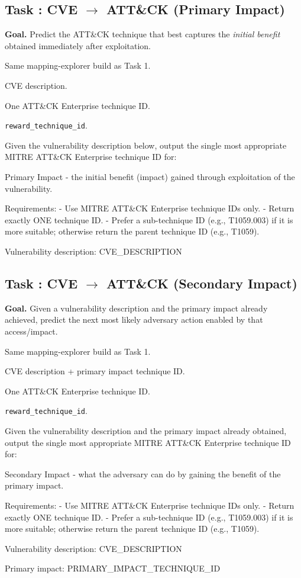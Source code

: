 \documentclass[11pt]{article}
\newcounter{task}
\newcommand{\tasksection}[1]{%
  \refstepcounter{task}%
  \subsection*{Task \thetask: #1}%
}
\newenvironment{taskmeta}{%
  \begin{description}[
      style=nextline,
      leftmargin=3.0cm,
      labelwidth=2.7cm,
      itemsep=0.15em,
      topsep=0.25em
  ]%
}{\end{description}}
\begin{document}
\tasksection{CVE $\rightarrow$ ATT\&CK (Primary Impact)}
\textbf{Goal.} Predict the ATT\&CK technique that best captures the \emph{initial benefit} obtained immediately after exploitation.
\begin{taskmeta}
  \item[Source] Same mapping-explorer build as Task 1.
  \item[Input] CVE description.
  \item[Output] One ATT\&CK Enterprise technique ID.
  \item[Reward] \texttt{reward\_technique\_id}.
\end{taskmeta}
\begin{promptbox}
Given the vulnerability description below, output the single most appropriate MITRE ATT&CK Enterprise technique ID for:

Primary Impact - the initial benefit (impact) gained through exploitation of the vulnerability.

Requirements:
- Use MITRE ATT&CK Enterprise technique IDs only.
- Return exactly ONE technique ID.
- Prefer a sub-technique ID (e.g., T1059.003) if it is more suitable; otherwise return the parent technique ID (e.g., T1059).

Vulnerability description:
{CVE_DESCRIPTION}
\end{promptbox}

\tasksection{CVE $\rightarrow$ ATT\&CK (Secondary Impact)}
\textbf{Goal.} Given a vulnerability description and the primary impact already achieved, predict the next most likely adversary action enabled by that access/impact.
\begin{taskmeta}
  \item[Source] Same mapping-explorer build as Task 1.
  \item[Input] CVE description + primary impact technique ID.
  \item[Output] One ATT\&CK Enterprise technique ID.
  \item[Reward] \texttt{reward\_technique\_id}.
\end{taskmeta}
\begin{promptbox}
Given the vulnerability description and the primary impact already obtained, output the single most appropriate MITRE ATT&CK Enterprise technique ID for:

Secondary Impact - what the adversary can do by gaining the benefit of the primary impact.

Requirements:
- Use MITRE ATT&CK Enterprise technique IDs only.
- Return exactly ONE technique ID.
- Prefer a sub-technique ID (e.g., T1059.003) if it is more suitable; otherwise return the parent technique ID (e.g., T1059).

Vulnerability description:
{CVE_DESCRIPTION}

Primary impact:
{PRIMARY_IMPACT_TECHNIQUE_ID}
\end{promptbox}
\end{document}
